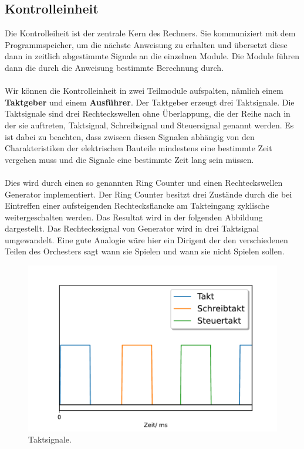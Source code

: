 \documentclass[11pt,a4paper,leqno]{report}
\numberwithin{equation}{chapter}
\begin{document}
\subsection{Kontrolleinheit}
Die Kontrolleiheit ist der zentrale Kern des Rechners. Sie kommuniziert mit dem Programmspeicher, um die n\"achste Anweisung zu erhalten und \"ubersetzt diese dann in zeitlich abgestimmte Signale an die einzelnen Module. Die Module f\"uhren dann die durch die Anweisung bestimmte Berechnung durch.
\\
\\
Wir k\"onnen die Kontrolleinheit in zwei Teilmodule aufspalten, n\"amlich einem \textbf{Taktgeber} und einem \textbf{Ausf\"uhrer}. Der Taktgeber erzeugt drei Taktsignale.
Die Taktsignale sind drei Rechteckswellen ohne \"Uberlappung, die der Reihe nach in der sie auftreten, Taktsignal, Schreibsignal und Steuersignal genannt werden.
Es ist dabei zu beachten, dass zwiscen diesen Signalen abh\"angig von den Charakteristiken der elektrischen Bauteile mindestens eine bestimmte Zeit vergehen muss und die Signale eine bestimmte Zeit lang sein m\"ussen.\\
\\
Dies wird durch einen so genannten Ring Counter und einen Rechteckswellen Generator implementiert. Der Ring Counter besitzt drei Zust\"ande durch die bei Eintreffen einer aufsteigenden Rechtecksflancke am Takteingang zyklische weitergeschalten werden. 
Das Resultat wird in der folgenden Abbildung dargestellt. Das Rechteckssignal von Generator wird in drei Taktsignal umgewandelt. Eine gute Analogie w\"are hier ein Dirigent der den verschiedenen Teilen des Orchesters sagt wann sie Spielen und wann sie nicht Spielen sollen.
\begin{figure}[H]
	\begin{center}
		\includegraphics[scale=0.6]{Bilder/tz.pdf}
		\caption{Taktsignale.}
	\end{center}
\end{figure}
\end{document}
